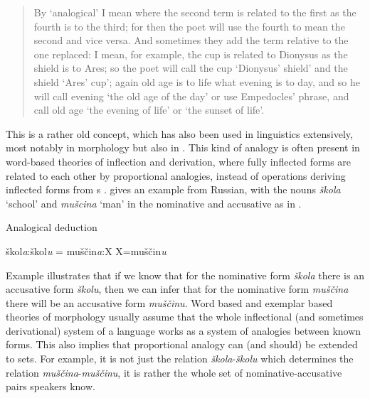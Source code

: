 \begin{quotation}
  By `analogical' I mean where the second term is related to the first as the fourth is to the third; for then the poet will use the fourth to mean the second and vice versa. And sometimes they add the term relative to the one replaced: I mean, for example, the cup is related to Dionysus as the shield is to Ares; so the poet will call the cup `Dionysus' shield' and the shield `Ares' cup'; again old age is to life what evening is to day, and so he will call evening `the old age of the day' or use Empedocles' phrase, and call old age `the evening of life' or `the sunset of life'. \autocite[Chapter III]{Russell.1989}
\end{quotation}

This is a rather old concept, which has also been used in linguistics extensively, most notably in morphology but also in  \autocite{Paul.1995}. This kind of analogy is often present in word-based theories of inflection and derivation, where fully inflected forms are related to each other by proportional analogies, instead of operations deriving inflected forms from s \autocites{Blevins.2006a, Blevins.2008, Blevins.2016a}. \textcite[543]{Blevins.2006a} gives an example from Russian, with the nouns \textit{škola} `school' and \textit{mušcina} `man' in the nominative and accusative as in .


\begin{exe}
    \ex \label{exe-analogy-prop} Analogical deduction
    \begin{xlist}
        \ex škol\textit{a}:škol\textit{u} = muščin\textit{a}:X
        \ex X=muščin\textit{u}
    \end{xlist}
\end{exe}

Example  illustrates that if we know that for the nominative form \textit{škola} there is an accusative form \textit{školu}, then we can infer that for the nominative form \textit{muščina} there will be an accusative form \textit{muščinu}. Word based and exemplar based theories of morphology usually assume that the whole inflectional (and sometimes derivational) system of a language works as a system of analogies between known forms. This also implies that proportional analogy can (and should) be extended to sets. For example, it is not just the relation \textit{škola}-\textit{školu} which determines the relation \textit{muščina}-\textit{muščinu}, it is rather the whole set of nominative-accusative pairs speakers know.

